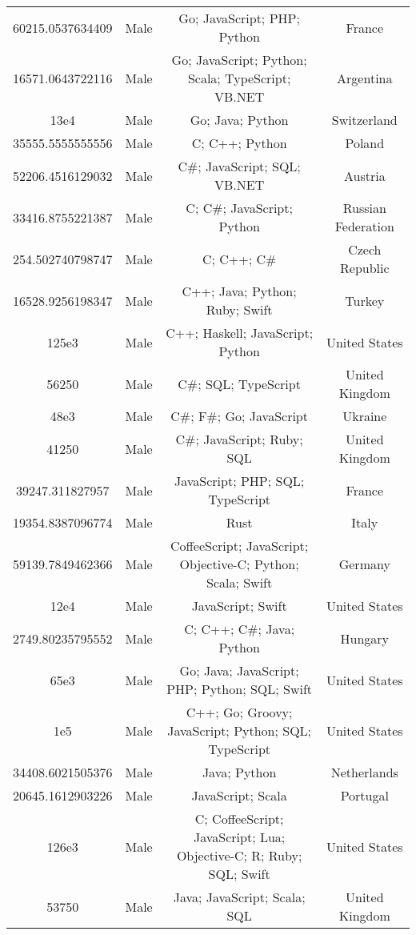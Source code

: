 \begin{center}
\begin{tabular}{ |c|c|c|c| }
60215.0537634409  &  Male  &  Go; JavaScript; PHP; Python  &  France  \\ 
16571.0643722116  &  Male  &  Go; JavaScript; Python; Scala; TypeScript; VB.NET  &  Argentina  \\ 
13e4  &  Male  &  Go; Java; Python  &  Switzerland  \\ 
35555.5555555556  &  Male  &  C; C++; Python  &  Poland  \\ 
52206.4516129032  &  Male  &  C\#; JavaScript; SQL; VB.NET  &  Austria  \\ 
33416.8755221387  &  Male  &  C; C\#; JavaScript; Python  &  Russian Federation  \\ 
254.502740798747  &  Male  &  C; C++; C\#  &  Czech Republic  \\ 
16528.9256198347  &  Male  &  C++; Java; Python; Ruby; Swift  &  Turkey  \\ 
125e3  &  Male  &  C++; Haskell; JavaScript; Python  &  United States  \\ 
56250  &  Male  &  C\#; SQL; TypeScript  &  United Kingdom  \\ 
48e3  &  Male  &  C\#; F\#; Go; JavaScript  &  Ukraine  \\ 
41250  &  Male  &  C\#; JavaScript; Ruby; SQL  &  United Kingdom  \\ 
39247.311827957  &  Male  &  JavaScript; PHP; SQL; TypeScript  &  France  \\ 
19354.8387096774  &  Male  &  Rust  &  Italy  \\ 
59139.7849462366  &  Male  &  CoffeeScript; JavaScript; Objective-C; Python; Scala; Swift  &  Germany  \\ 
12e4  &  Male  &  JavaScript; Swift  &  United States  \\ 
2749.80235795552  &  Male  &  C; C++; C\#; Java; Python  &  Hungary  \\ 
65e3  &  Male  &  Go; Java; JavaScript; PHP; Python; SQL; Swift  &  United States  \\ 
1e5  &  Male  &  C++; Go; Groovy; JavaScript; Python; SQL; TypeScript  &  United States  \\ 
34408.6021505376  &  Male  &  Java; Python  &  Netherlands  \\ 
20645.1612903226  &  Male  &  JavaScript; Scala  &  Portugal  \\ 
126e3  &  Male  &  C; CoffeeScript; JavaScript; Lua; Objective-C; R; Ruby; SQL; Swift  &  United States  \\ 
53750  &  Male  &  Java; JavaScript; Scala; SQL  &  United Kingdom  \\ 

\end{tabular}
\end{center}
